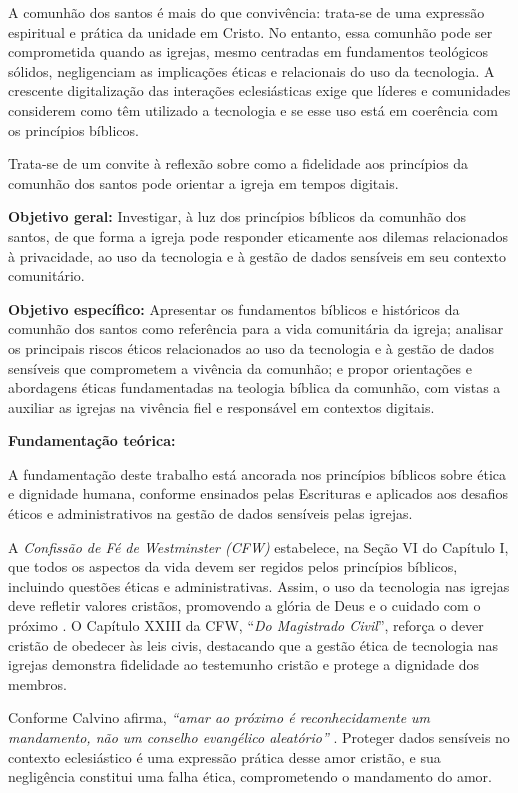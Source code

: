 \documentclass[12pt,a4paper]{article}
\begin{document}
A comunhão dos santos é mais do que convivência: trata-se de uma expressão espiritual e prática da unidade em Cristo. No entanto, essa comunhão pode ser comprometida quando as igrejas, mesmo centradas em fundamentos teológicos sólidos, negligenciam as implicações éticas e relacionais do uso da tecnologia. A crescente digitalização das interações eclesiásticas exige que líderes e comunidades considerem como têm utilizado a tecnologia e se esse uso está em coerência com os princípios bíblicos.

Trata-se de um convite à reflexão sobre como a fidelidade aos princípios da comunhão dos santos pode orientar a igreja em tempos digitais.

\noindent
\textbf{Objetivo geral:} Investigar, à luz dos princípios bíblicos da comunhão dos santos, de que forma a igreja pode responder eticamente aos dilemas relacionados à privacidade, ao uso da tecnologia e à gestão de dados sensíveis em seu contexto comunitário.

\noindent
\textbf{Objetivo específico:} Apresentar os fundamentos bíblicos e históricos da comunhão dos santos como referência para a vida comunitária da igreja; analisar os principais riscos éticos relacionados ao uso da tecnologia e à gestão de dados sensíveis que comprometem a vivência da comunhão; e propor orientações e abordagens éticas fundamentadas na teologia bíblica da comunhão, com vistas a auxiliar as igrejas na vivência fiel e responsável em contextos digitais.

\noindent
\textbf{Fundamentação teórica:}

A fundamentação deste trabalho está ancorada nos princípios bíblicos sobre ética e dignidade humana, conforme ensinados pelas Escrituras e aplicados aos desafios éticos e administrativos na gestão de dados sensíveis pelas igrejas.

A \textit{Confissão de Fé de Westminster (CFW)} estabelece, na Seção VI do Capítulo I, que todos os aspectos da vida devem ser regidos pelos princípios bíblicos, incluindo questões éticas e administrativas. Assim, o uso da tecnologia nas igrejas deve refletir valores cristãos, promovendo a glória de Deus e o cuidado com o próximo \cite{cfw}. O Capítulo XXIII da CFW, ``\textit{Do Magistrado Civil}'', reforça o dever cristão de obedecer às leis civis, destacando que a gestão ética de tecnologia nas igrejas demonstra fidelidade ao testemunho cristão e protege a dignidade dos membros.

Conforme Calvino afirma, \textit {``amar ao próximo é reconhecidamente um mandamento, não um conselho evangélico aleatório''} \cite[p.~453]{calvino2022}. Proteger dados sensíveis no contexto eclesiástico é uma expressão prática desse amor cristão, e sua negligência constitui uma falha ética, comprometendo o mandamento do amor.
\end{document}
